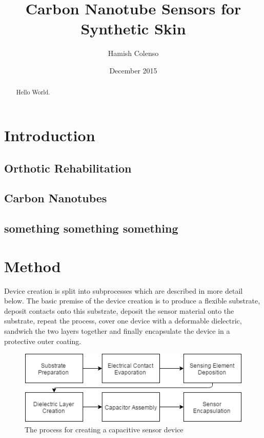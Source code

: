 \documentclass[11pt,twoside,a4paper]{article}
\begin{document}
	\title{Carbon Nanotube Sensors for Synthetic Skin}
	\author{Hamish Colenso}
	\date{December 2015}
	\maketitle
	
	\begin{abstract}
		Hello World.
	
	\end{abstract}
	
	\newpage
	\section{Introduction}
		\subsection{Orthotic Rehabilitation}
		\subsection{Carbon Nanotubes}
		\subsection{something something something}
	\newpage
	\section{Method}
		Device creation is split into subprocesses which are described in more detail below. The basic premise of the device creation is to produce a flexible substrate, deposit contacts 			onto this substrate, deposit the sensor material onto the substrate, repeat the process, cover one device with a deformable dielectric, sandwich the two layers together and 			finally encapsulate the device in a protective outer coating. 
		\newline
		\begin{figure}[H]
			\centering
			\includegraphics[scale=.8]{ProcessDiagram}
			\caption{The process for creating a capacitive sensor device}
		\end{figure}
\end{document}
